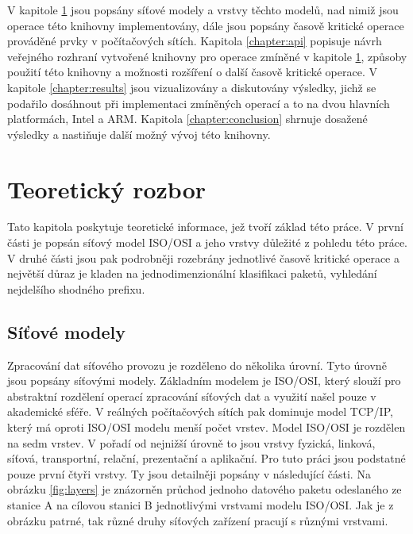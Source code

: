 V kapitole \ref{chapter:theoretical} jsou popsány síťové modely a vrstvy těchto modelů,
nad nimiž jsou operace této knihovny implementovány, dále jsou popsány časově kritické operace prováděné
prvky v počítačových sítích. Kapitola \ref{chapter:api} popisuje návrh veřejného rozhraní vytvořené knihovny
pro operace zmíněné v kapitole \ref{chapter:theoretical}, způsoby použití této knihovny a možnosti rozšíření
o další časově kritické operace. V kapitole \ref{chapter:results} jsou vizualizovány a diskutovány
výsledky, jichž se podařilo dosáhnout při implementaci zmíněných operací a to na dvou hlavních platformách, Intel a ARM.
Kapitola \ref{chapter:conclusion} shrnuje dosažené výsledky a nastiňuje další možný vývoj této knihovny.

\chapter{Teoretický rozbor}\label{chapter:theoretical} %

Tato kapitola poskytuje teoretické informace, jež tvoří základ této práce.
V první části je popsán síťový model ISO/OSI a jeho vrstvy důležité z pohledu této práce.
V druhé části jsou pak podrobněji rozebrány jednotlivé časově kritické operace a největší důraz je
kladen na jednodimenzionální klasifikaci paketů, vyhledání nejdelšího shodného prefixu.


\section{Síťové modely}\label{section:models} %
Zpracování dat síťového provozu je rozděleno do několika úrovní. Tyto úrovně jsou popsány síťovými modely.
Základním modelem je ISO/OSI, který slouží pro abstraktní rozdělení operací zpracování síťových dat a využití
našel pouze v akademické sféře. V reálných počítačových sítích pak dominuje model TCP/IP, který má oproti
ISO/OSI modelu menší počet vrstev. Model ISO/OSI je rozdělen na sedm vrstev. V pořadí od nejnižší úrovně to
jsou vrstvy fyzická, linková, síťová, transportní, relační, prezentační a aplikační. Pro tuto práci jsou
podstatné pouze první čtyři vrstvy. Ty jsou detailněji popsány v následující části. Na obrázku \ref{fig:layers} je
znázorněn průchod jednoho datového paketu odeslaného ze stanice A na cílovou stanici B jednotlivými vrstvami modelu ISO/OSI. Jak je z obrázku patrné, tak různé druhy síťových zařízení pracují s různými vrstvami.

